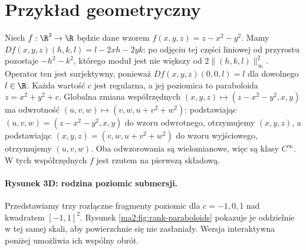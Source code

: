 \section{Przykład geometryczny}

\begin{przyklad}
\label{ma2:ex:rank-paraboloids}
Niech $f:\R^3\to\R$ będzie dane wzorem
$f(x,y,z)=z-x^2-y^2$. Mamy
$Df(x,y,z)(h,k,l)=l-2xh-2yk$:
po odjęciu tej części liniowej od przyrostu pozostaje
$-h^2-k^2$, którego moduł jest nie większy
od $2\|(h,k,l)\|_\infty^2$.
Operator ten jest surjektywny, ponieważ
$Df(x,y,z)(0,0,l)=l$ dla dowolnego $l\in\R$.
Każda wartość $c$ jest regularna, a jej poziomica
to paraboloida $z=x^2+y^2+c$. Globalna zmiana
współrzędnych $(x,y,z)\mapsto(z-x^2-y^2,x,y)$
ma odwrotność $(u,v,w)\mapsto(v,w,u+v^2+w^2)$:
podstawiając $(u,v,w)=(z-x^2-y^2,x,y)$ do wzoru
odwrotnego, otrzymujemy $(x,y,z)$, a podstawiając
$(x,y,z)=(v,w,u+v^2+w^2)$ do wzoru wyjściowego,
otrzymujemy $(u,v,w)$. Oba odwzorowania są wielomianowe,
więc są klasy $C^\infty$. W tych współrzędnych
$f$ jest rzutem na pierwszą składową.
\end{przyklad}

\paragraph{Rysunek 3D: rodzina poziomic submersji.}
Przedstawiamy trzy rozłączne fragmenty poziomic
dla $c=-1,0,1$ nad kwadratem $[-1,1]^2$.
Rysunek \ref{ma2:fig:rank-paraboloids} pokazuje je oddzielnie
w tej samej skali, aby powierzchnie się nie zasłaniały.
Wersja interaktywna poniżej umożliwia ich wspólny obrót.

